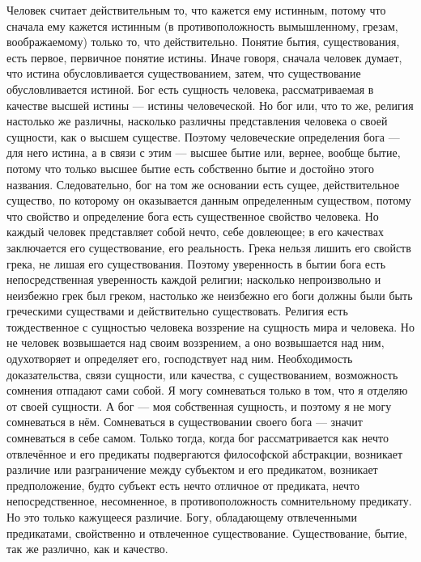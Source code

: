 \documentclass[12pt,oneside]{book}
\begin{document}
Человек считает действительным то, что кажется ему истинным, потому что сначала ему кажется истинным (в противоположность вымышленному, грезам, воображаемому) только то, что действительно. Понятие бытия, существования, есть первое, первичное понятие истины. Иначе говоря, сначала человек думает, что истина обусловливается существованием, затем, что существование обусловливается истиной. Бог есть сущность человека, рассматриваемая в качестве высшей истины --- истины человеческой. Но бог или, что то же, религия настолько же различны, насколько различны представления человека о своей сущности, как о высшем существе. Поэтому человеческие определения бога --- для него истина, а в связи с этим --- высшее бытие или, вернее, вообще бытие, потому что только высшее бытие есть собственно бытие и достойно этого названия. Следовательно, бог на том же основании есть сущее, действительное существо, по которому он оказывается данным определенным существом, потому что свойство и определение бога есть существенное свойство человека. Но каждый человек представляет собой нечто, себе довлеющее; в его качествах заключается его существование, его реальность. Грека нельзя лишить его свойств грека, не лишая его существования. Поэтому уверенность в бытии бога есть непосредственная уверенность каждой религии; насколько непроизвольно и неизбежно грек был греком, настолько же неизбежно его боги должны были быть греческими существами и действительно существовать. Религия есть тождественное с сущностью человека воззрение на сущность мира и человека. Но не человек возвышается над своим воззрением, а оно возвышается над ним, одухотворяет и определяет его, господствует над ним. Необходимость доказательства, связи сущности, или качества, с существованием, возможность сомнения отпадают сами собой. Я могу сомневаться только в том, что я отделяю от своей сущности. А бог --- моя собственная сущность, и поэтому я не могу сомневаться в нём. Сомневаться в существовании своего бога --- значит сомневаться в себе самом. Только тогда, когда бог рассматривается как нечто отвлечённое и его предикаты подвергаются философской абстракции, возникает различие или разграничение между субъектом и его предикатом, возникает предположение, будто субъект есть нечто отличное от предиката, нечто непосредственное, несомненное, в противоположность сомнительному предикату. Но это только кажущееся различие. Богу, обладающему отвлеченными предикатами, свойственно и отвлеченное существование. Существование, бытие, так же различно, как и качество.
\end{document}
